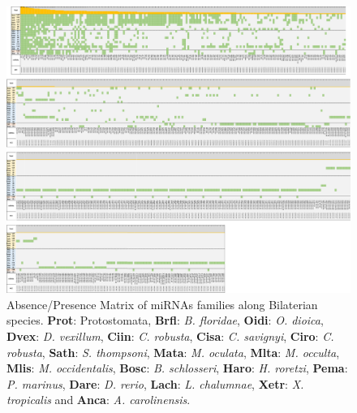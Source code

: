 \documentclass[graybox]{svmult}
\begin{document}
\begin{figure}[ht!]
\centering 
\includegraphics[width=\textwidth, angle=90]{./Images/miRNA_matrix}
\caption{Absence/Presence Matrix of miRNAs families along Bilaterian species. 
\textbf{Prot}: Protostomata, \textbf{Brfl}: \textit{B. floridae}, 
\textbf{Oidi}: \textit{O. dioica}, \textbf{Dvex}: \textit{D. vexillum}, 
\textbf{Ciin}: \textit{C. robusta}, \textbf{Cisa}: \textit{C. savignyi}, 
\textbf{Ciro}: \textit{C. robusta}, \textbf{Sath}: \textit{S. thompsoni}, 
\textbf{Mata}: \textit{M. oculata}, \textbf{Mlta}: \textit{M. occulta}, 
\textbf{Mlis}: \textit{M. occidentalis}, \textbf{Bosc}: \textit{B. schlosseri}, 
\textbf{Haro}: \textit{H. roretzi}, \textbf{Pema}: \textit{P. marinus}, 
\textbf{Dare}: \textit{D. rerio}, \textbf{Lach}: \textit{L. chalumnae}, 
\textbf{Xetr}: \textit{X. tropicalis} and \textbf{Anca}: \textit{A. 
carolinensis}. }
\label{fig:matrimirnas}
\end{figure}
\end{document}
